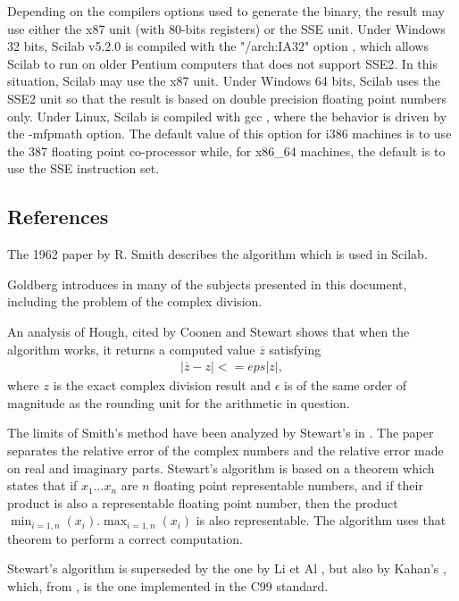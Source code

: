Depending on the compilers options used to generate the binary,
the result may use either the x87 unit (with 80-bits registers) or the 
SSE unit. Under Windows 32 bits, Scilab v5.2.0 is compiled with the "/arch:IA32" 
option \cite{CordenKreitzerIntel2009}, which allows Scilab to run on 
older Pentium computers that does not support SSE2. In this situation,
Scilab may use the x87 unit. Under Windows 64 bits, Scilab uses the SSE2 unit so that the result 
is based on double precision floating point numbers only.
Under Linux, Scilab is compiled with gcc \cite{GCCManual2008}, 
where the behavior is driven by the -mfpmath option. The default value of this option for i386 machines 
is to use the 387 floating point co-processor while, for x86\_64 machines, the default 
is to use the SSE instruction set.

\subsection{References}

The 1962 paper by R. Smith \cite{Smith1962} describes the algorithm which is used in 
Scilab. 

Goldberg introduces in \cite{WhatEveryComputerScientist} many 
of the subjects presented in this document, including the problem of the 
complex division. 

An analysis of Hough, cited by Coonen \cite{1667289} and Stewart \cite{214414} 
shows that when the algorithm works, it returns a computed value $\overline{z}$
satisfying
\begin{eqnarray}
|\overline{z} - z| <= eps |z|,
\end{eqnarray}
where $z$ is the exact complex division result and $\epsilon$ is of the same order of magnitude 
as the rounding unit for the arithmetic in question. 

The limits of Smith's method have been analyzed by Stewart's in \cite{214414}.
The paper separates the relative error of the complex numbers and the relative
error made on real and imaginary parts. 
Stewart's algorithm is based on a theorem which states that if $x_1 \ldots x_n$
are $n$ floating point representable numbers, and if their product is also 
a representable floating point number, then the product $\min_{i=1,n}(x_i) . \max_{i=1,n}(x_i)$
is also representable. The algorithm uses that theorem to perform a 
correct computation.

Stewart's algorithm is superseded by the one by Li et Al \cite{567808}, but 
also by Kahan's \cite{KAHAN1987}, which, from  \cite{1039814}, is the one implemented
in the C99 standard.

